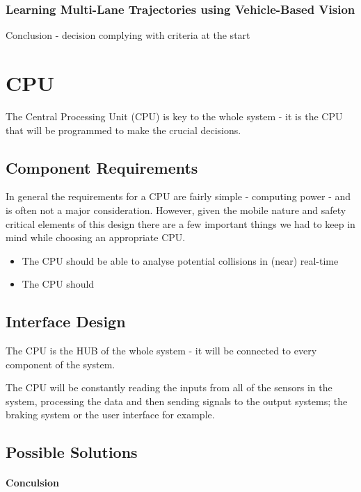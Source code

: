 \documentclass[a4paper]{report}
\begin{document}
{\subsubsection{Learning Multi-Lane Trajectories using Vehicle-Based Vision \citep{multi-lane_traj}}

Conclusion - decision complying with criteria at the start

\section{CPU}
The Central Processing Unit (CPU) is key to the whole system - it is the CPU that will be programmed to make the crucial decisions.
\subsection{Component Requirements}
In general the requirements for a CPU are fairly simple - computing power - and is often not a major consideration. However, given the mobile nature and safety critical elements of this design there are a few important things we had to keep in mind while choosing an appropriate CPU.

\begin{itemize}
  \item The CPU should be able to analyse potential collisions in (near) real-time
  \item The CPU should 
\end{itemize}
\subsection{Interface Design}
The CPU is the HUB of the whole system - it will be connected to every component of the system.

The CPU will be constantly reading the inputs from all of the sensors in the system, processing the data and then sending signals to the output systems; the braking system or the user interface for example. 
\subsection{Possible Solutions}
\paragraph{Conculsion}



}
\end{document}
